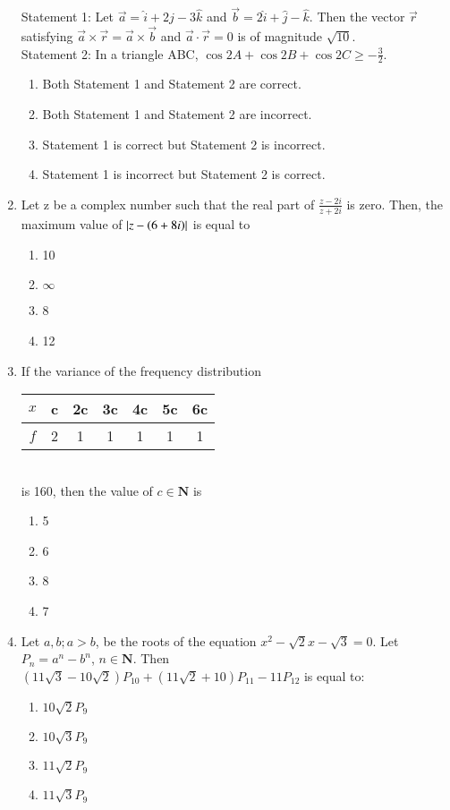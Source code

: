 \documentclass[journal]{IEEEtran}
\numberwithin{equation}{enumi}
\numberwithin{figure}{enumi}
\begin{document}
\begin{enumerate}
    Statement 1: Let $\vec{a}=\hat{i}+2\hat{j}-3\hat{k}$ and $\vec{b}=2\hat{i}+\hat{j}-\hat{k}$. Then the vector $\vec{r}$ satisfying $\vec{a}\times\vec{r}=\vec{a}\times\vec{b}$ and $\vec{a}\cdot\vec{r}=0$ is of magnitude $\sqrt{10}$.\\
    Statement 2: In a triangle ABC, $\cos{2A}+\cos{2B}+\cos{2C}\geq -\frac{3}{2}.$
    \begin{enumerate}
        \item Both Statement 1 and Statement 2 are correct.
        \item Both Statement 1 and Statement 2 are incorrect.
        \item Statement 1 is correct but Statement 2 is incorrect.
        \item Statement 1 is incorrect but Statement 2 is correct.
    \end{enumerate}
    \item Let z be a complex number such that the real part of $\frac{z-2i}{z+2i}$ is zero. Then, the maximum value of $\left\vert z-\left(6+8i\right)\right\vert$ is equal to
    \begin{enumerate}
        \item 10
        \item $\infty$
        \item 8
        \item 12
    \end{enumerate}
    \item If the variance of the frequency distribution \\
   \begin{tabular}{|c|c|c|c|c|c|c|} 
        \hline
            $x$ & c & 2c & 3c & 4c & 5c & 6c \\ 
        \hline
            $f$ & 2 & 1 & 1 & 1 & 1 & 1 \\ 
        \hline
    \end{tabular}\\
    is 160, then the value of $c\in\mathbf{N}$ is
    \begin{enumerate}
        \item 5
        \item 6
        \item 8
        \item 7
    \end{enumerate}
   \item Let $a, b ;a > b$, be the roots of the equation $x^2 - \sqrt{2}x - \sqrt{3} = 0$. Let $P_n = a^n-b^n$, $n\in\mathbf{N}$. Then $(11\sqrt{3} - 10\sqrt{2})P_{10} + (11\sqrt{2} + 10)P_{11} - 11P_{12}$ is equal to:
    \begin{enumerate}
        \item $10\sqrt{2} P_9$
        \item $10\sqrt{3} P_9$
        \item $11\sqrt{2} P_9$
        \item $11\sqrt{3} P_9$
    \end{enumerate}

\end{enumerate}
\end{document}
